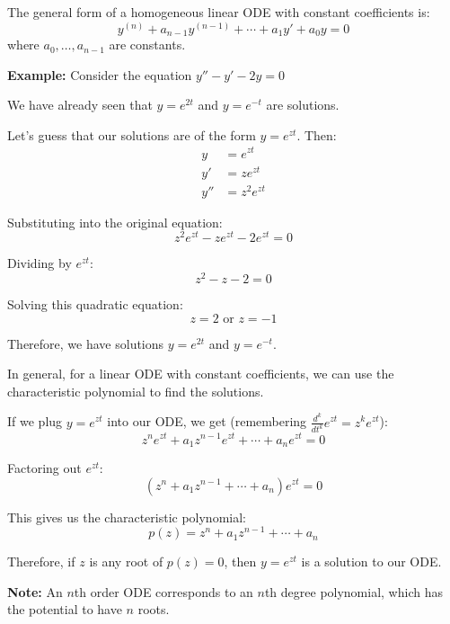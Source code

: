 \documentclass{article}
\begin{document}
The general form of a homogeneous linear ODE with constant coefficients is:
\begin{equation*}
y^{(n)} + a_{n-1}y^{(n-1)} + \cdots + a_1y' + a_0y = 0
\end{equation*}
where $a_0, \ldots, a_{n-1}$ are constants.

\textbf{Example:} Consider the equation $y'' - y' - 2y = 0$

We have already seen that $y = e^{2t}$ and $y = e^{-t}$ are solutions.

Let's guess that our solutions are of the form $y = e^{zt}$. Then:
\begin{align*}
y &= e^{zt} \\
y' &= ze^{zt} \\
y'' &= z^2e^{zt}
\end{align*}

Substituting into the original equation:
\begin{equation*}
z^2e^{zt} - ze^{zt} - 2e^{zt} = 0
\end{equation*}

Dividing by $e^{zt}$:
\begin{equation*}
z^2 - z - 2 = 0
\end{equation*}

Solving this quadratic equation:
\begin{equation*}
z = 2 \text{ or } z = -1
\end{equation*}

Therefore, we have solutions $y = e^{2t}$ and $y = e^{-t}$.

In general, for a linear ODE with constant coefficients, we can use the characteristic polynomial to find the solutions.

If we plug $y=e^{zt}$ into our ODE, we get (remembering $\frac{d^k}{dt^k} e^{zt} = z^k e^{zt}$):
\begin{equation*}
z^n e^{zt} + a_1 z^{n-1} e^{zt} + \cdots + a_n e^{zt} = 0
\end{equation*}

Factoring out $e^{zt}$:
\begin{equation*}
(z^n + a_1 z^{n-1} + \cdots + a_n) e^{zt} = 0
\end{equation*}

This gives us the characteristic polynomial:
\[
p(z) = z^n + a_1 z^{n-1} + \cdots + a_n
\]

Therefore, if $z$ is any root of $p(z) = 0$, then $y = e^{zt}$ is a solution to our ODE.

\textbf{Note:} An $n$th order ODE corresponds to an $n$th degree polynomial, which has the potential to have $n$ roots.
\end{document}
